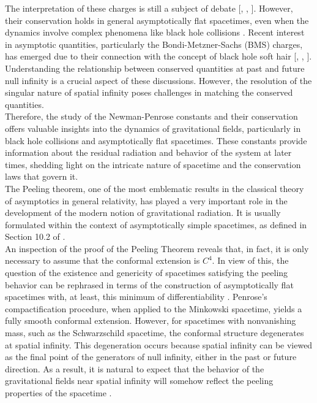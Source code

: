 The interpretation of these charges is still a subject of debate [\cite{PenRin84}, \cite{DaiVal02}, \cite{Bac10}]. However, their conservation holds in general asymptotically flat spacetimes, even when the dynamics involve complex phenomena like black hole collisions \cite{DaiVal02}. Recent interest in asymptotic quantities, particularly the Bondi-Metzner-Sachs (BMS) charges, has emerged due to their connection with the concept of black hole soft hair [\cite{HawMalStr16}, \cite{HawMalStr17}, \cite{HeLyMi15}]. Understanding the relationship between conserved quantities at past and future null infinity is a crucial aspect of these discussions. However, the resolution of the singular nature of spatial infinity poses challenges in matching the conserved quantities.
\\
Therefore, the study of the Newman-Penrose constants and their conservation offers valuable insights into the dynamics of gravitational fields, particularly in black hole collisions and asymptotically flat spacetimes. These constants provide information about the residual radiation and behavior of the system at later times, shedding light on the intricate nature of spacetime and the conservation laws that govern it.
\\
The Peeling theorem, one of the most emblematic results in the classical theory of asymptotics in general relativity, has played a very important role in the development of the modern notion of gravitational radiation. It is usually formulated within the context of asymptotically simple spacetimes, as defined in Section 10.2 of \cite{Val16}.
\\
An inspection of the proof of the Peeling Theorem reveals that, in fact, it is only necessary to assume that the conformal extension is $C^{4}$.  In view of this, the question of the existence and genericity of spacetimes satisfying the peeling behavior can be rephrased in terms of the construction of asymptotically flat spacetimes with, at least, this minimum of differentiability \cite{GasVal17}. Penrose's compactification procedure, when applied to the Minkowski spacetime, yields a fully smooth conformal extension. However, for spacetimes with nonvanishing mass, such as the Schwarzschild spacetime, the conformal structure degenerates at spatial infinity. This degeneration occurs because spatial infinity can be viewed as the final point of the generators of null infinity, either in the past or future direction. As a result, it is natural to expect that the behavior of the gravitational fields near spatial infinity will somehow reflect the peeling properties of the spacetime \cite{Pen65a}.
